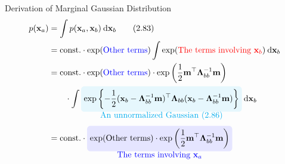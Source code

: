 \documentclass[10pt]{beamer}
\newcommand{\redtext}[1]{\textcolor{red}{#1}}
\newcommand{\bluetext}[1]{\textcolor{blue}{#1}}
\newcommand{\highlightcap}[3][yellow]{\tikz[baseline=(x.base)]{\node[rectangle,rounded corners,fill=#1!10](x){$#2$} node[below of=x, node distance=2em, color=#1]{#3};}}
\begin{document}
    \begin{frame}{Derivation of Marginal Gaussian Distribution}
        \begin{align*}
            p(\mathbf x_a) &= \int p(\mathbf x_a, \mathbf x_b) \:\mathrm d\mathbf x_b \tag{2.83}\\
            &= \mathrm{const.}\cdot \exp(\bluetext{\mbox{Other terms}}) \int \exp(\redtext{\mbox{The terms involving $\mathbf x_b$}}) \:\mathrm d\mathbf x_b \\
            &= \mathrm{const.}\cdot \exp(\bluetext{\mbox{Other terms}}) \cdot \exp\left( \frac{1}{2}\mathbf m^\top\bm\Lambda_{bb}^{-1}\mathbf m\right) \\
            &\qquad \cdot \int \highlightcap[cyan]{\displaystyle \exp\left\{ -\frac{1}{2}(\mathbf x_b - \bm\Lambda_{bb}^{-1}\mathbf m)^\top\bm\Lambda_{bb}(\mathbf x_b - \bm\Lambda_{bb}^{-1}\mathbf m) \right\}}{An unnormalized Gaussian (2.86)} \:\mathrm d\mathbf x_b \\
            &= \mathrm{const.}\cdot 
                \highlightcap[blue]{\displaystyle \exp(\mbox{Other terms}) \cdot \exp\left( \frac{1}{2}\mathbf m^\top\bm\Lambda_{bb}^{-1}\mathbf m\right)}{The terms involving $\mathbf x_a$}
        \end{align*}
    \end{frame}
    
\end{document}
